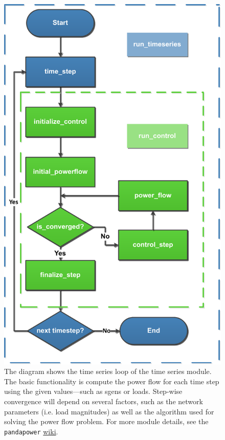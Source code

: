 \documentclass[a4paper,10pt]{report}
\begin{document}
\begin{figure}[htpb]
	\centering
	\includegraphics[width=0.45\linewidth]{timeseries_module_diag.pdf}
	\caption[\texttt{pandapower} times series module overview]{The diagram shows the time series loop of the time series module. The basic functionality is compute the power flow for each time step using the given values---such as sgens or loads. Step-wise convergence will depend on several factors, such as the network parameters (i.e. load magnitudes) as well as the algorithm used for solving the power flow problem. For more module details, see the \texttt{pandapower}  \href{https://pandapower.readthedocs.io/en/v2.10.1/timeseries/timeseries_loop.html}{wiki}.}
	\label{timeseries_module_diag}
\end{figure}
\end{document}
